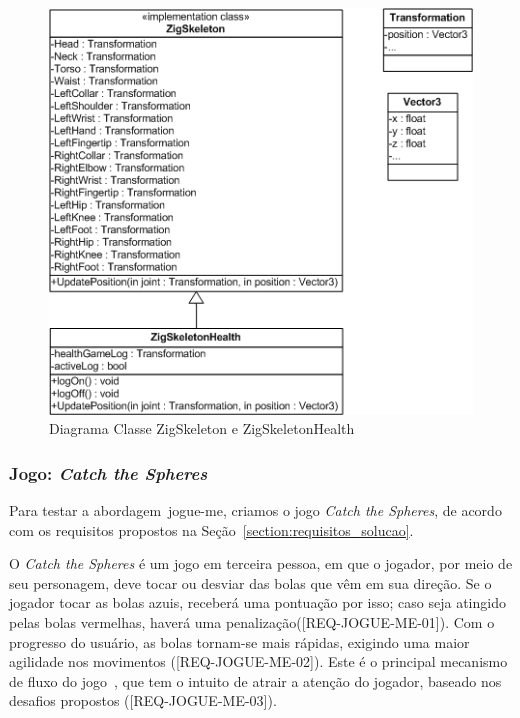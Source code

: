 \begin{figure}[!htbp]
 \centering
 \includegraphics[scale=0.8]{./img/diagclasszigfu.png}
 \caption{Diagrama Classe ZigSkeleton e ZigSkeletonHealth}
 \label{fig:diagramaclassezigfu}
\end{figure}
%

\subsubsection{Jogo: \textit{Catch the Spheres}}\label{jogo_catch}
Para testar a abordagem~\ac{jogue-me}, criamos o jogo \textit{Catch the Spheres}, de acordo com os requisitos propostos na Seção~\ref{section:requisitos_solucao}.  

O \textit{Catch the Spheres} é um jogo em terceira pessoa, em que o jogador, por meio de seu personagem, deve tocar ou desviar das bolas que vêm em sua direção. Se o jogador tocar as bolas azuis, receberá uma pontuação por isso; caso seja atingido pelas bolas vermelhas, haverá uma penalização([REQ-JOGUE-ME-01]). Com o progresso do usuário, as bolas tornam-se mais rápidas, exigindo uma maior agilidade nos movimentos ([REQ-JOGUE-ME-02]). Este é o principal mecanismo de fluxo do jogo~\cite{sweetser2005-gameflow}, que tem o intuito de atrair a atenção do jogador, baseado nos desafios propostos ([REQ-JOGUE-ME-03]). 

